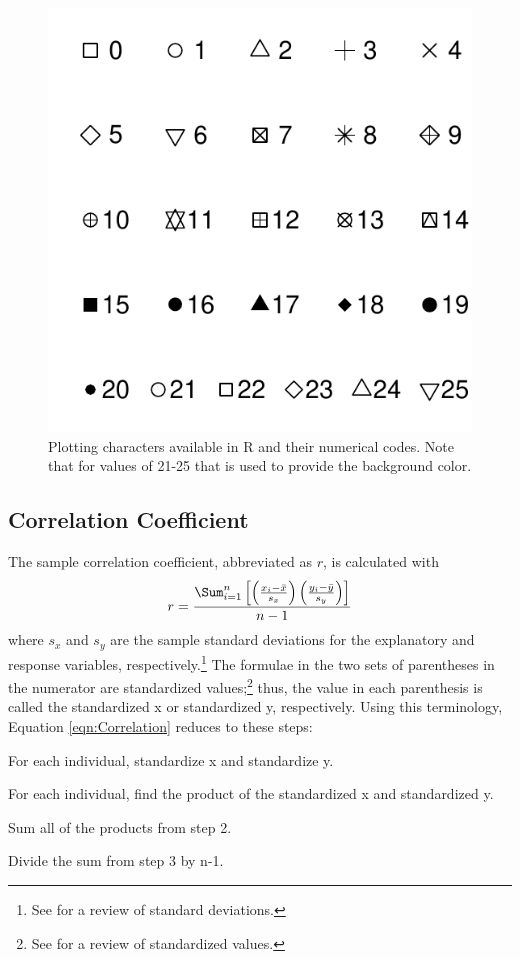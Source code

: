 \documentclass[10pt,openany]{book}\usepackage[]{graphicx}\usepackage[]{color}
\newenvironment{knitrout}{}{} %
\begin{document}
\begin{knitrout}
\color{fgcolor}\begin{figure}[hbtp]

{\centering \includegraphics[width=.4\linewidth]{Figs/Rpch-1} 

}

\caption[Plotting characters available in R and their numerical codes]{Plotting characters available in R and their numerical codes. Note that for values of 21-25 that  is used to provide the background color.}\label{fig:Rpch}
\end{figure}


\end{knitrout}


\subsection{Correlation Coefficient}\label{sect:corr}
The sample correlation coefficient, abbreviated as $r$, is calculated with
\begin{equation} \label{eqn:Correlation}
  r = \frac{\Sum_{i=1}^{n}\left[\left(\frac{x_{i}-\bar{x}}{s_{x}}\right)\left(\frac{y_{i}-\bar{y}}{s_{y}}\right)\right]}{n-1}
\end{equation}
where $s_{x}$ and $s_{y}$ are the sample standard deviations for the explanatory and response variables, respectively.\footnote{See  for a review of standard deviations.} The formulae in the two sets of parentheses in the numerator are standardized values;\footnote{See  for a review of standardized values.} thus, the value in each parenthesis is called the standardized x or standardized y, respectively. Using this terminology, Equation \eqref{eqn:Correlation} reduces to these steps:
\begin{Enumerate}
  \item For each individual, standardize x and standardize y.
  \item For each individual, find the product of the standardized x and standardized y.
  \item Sum all of the products from step 2.
  \item Divide the sum from step 3 by n-1.
\end{Enumerate}
\end{document}
